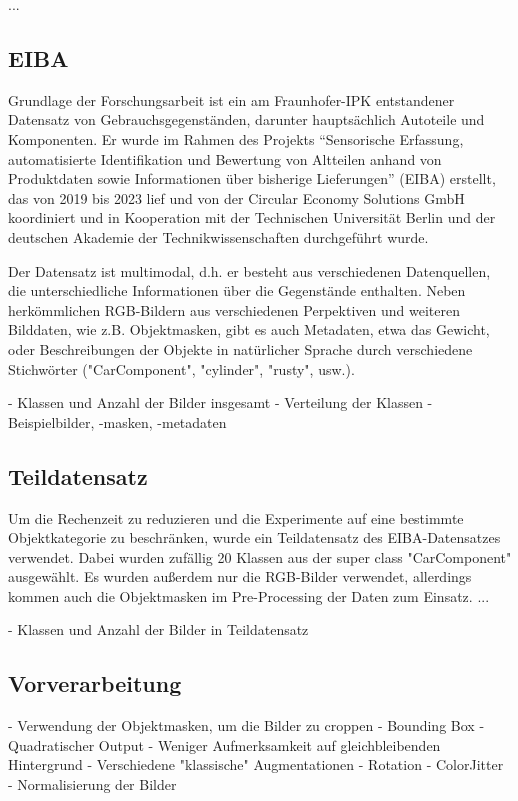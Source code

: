 ...

\subsection{EIBA}

Grundlage der Forschungsarbeit ist ein am Fraunhofer-IPK entstandener Datensatz von Gebrauchsgegenständen, darunter hauptsächlich Autoteile und Komponenten. Er wurde im Rahmen des Projekts “Sensorische Erfassung, automatisierte Identifikation und Bewertung von Altteilen anhand von Produktdaten sowie Informationen über bisherige Lieferungen” (EIBA) erstellt, das von 2019 bis 2023 lief und von der Circular Economy Solutions GmbH koordiniert und in Kooperation mit der Technischen Universität Berlin und der deutschen Akademie der Technikwissenschaften durchgeführt wurde. \cite{}

Der Datensatz ist multimodal, d.h. er besteht aus verschiedenen Datenquellen, die unterschiedliche Informationen über die Gegenstände enthalten. Neben herkömmlichen RGB-Bildern aus verschiedenen Perpektiven und weiteren Bilddaten, wie z.B. Objektmasken, gibt es auch Metadaten, etwa das Gewicht, oder Beschreibungen der Objekte in natürlicher Sprache durch verschiedene Stichwörter ("CarComponent", "cylinder", "rusty", usw.).

- Klassen und Anzahl der Bilder insgesamt
- Verteilung der Klassen
- Beispielbilder, -masken, -metadaten

\subsection{Teildatensatz}

Um die Rechenzeit zu reduzieren und die Experimente auf eine bestimmte Objektkategorie zu beschränken, wurde ein Teildatensatz des EIBA-Datensatzes verwendet. Dabei wurden zufällig 20 Klassen aus der super class "CarComponent" ausgewählt. Es wurden außerdem nur die RGB-Bilder verwendet, allerdings kommen auch die Objektmasken im Pre-Processing der Daten zum Einsatz. ...

- Klassen und Anzahl der Bilder in Teildatensatz

\subsection{Vorverarbeitung}

- Verwendung der Objektmasken, um die Bilder zu croppen
	- Bounding Box
	- Quadratischer Output
	- Weniger Aufmerksamkeit auf gleichbleibenden Hintergrund
- Verschiedene "klassische" Augmentationen
	- Rotation
	- ColorJitter
- Normalisierung der Bilder

